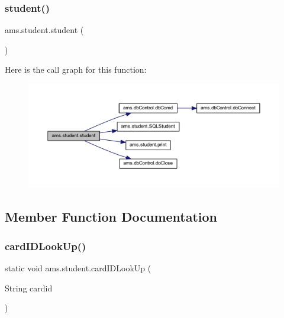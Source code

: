 \subsubsection{\texorpdfstring{student()}{student()}}
{\footnotesize\ttfamily ams.\+student.\+student (\begin{DoxyParamCaption}{ }\end{DoxyParamCaption})}

Here is the call graph for this function\+:\nopagebreak
\begin{figure}[H]
\begin{center}
\leavevmode
\includegraphics[width=350pt]{classams_1_1student_ad03bb53d0a1de89f9e960925e3f226ef_cgraph}
\end{center}
\end{figure}


\subsection{Member Function Documentation}
\mbox{\label{classams_1_1student_a8395e89b09114ce0b7d2c343b11c6d41}} 
\subsubsection{\texorpdfstring{cardIDLookUp()}{cardIDLookUp()}}
{\footnotesize\ttfamily static void ams.\+student.\+card\+I\+D\+Look\+Up (\begin{DoxyParamCaption}\item[{String}]{cardid }\end{DoxyParamCaption})\hspace{0.3cm}{\ttfamily [static]}}

